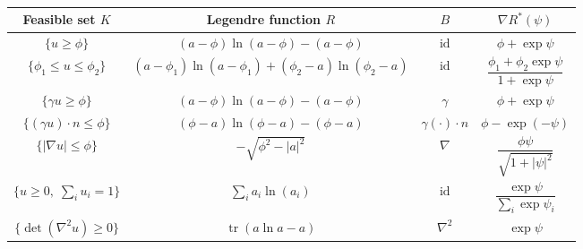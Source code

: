 \documentclass[aspectratio=169,xcolor=dvipsnames,11pt]{beamer}
\begin{document}
\begin{frame}\frametitle{}
\thispagestyle{empty}
\begin{table}
\centering
\small
\setlength{\tabcolsep}{5pt}
\renewcommand{\arraystretch}{1.4}
    \begin{tabular}{ c|c|c|c } 
     \toprule
      Feasible set $K$ & Legendre function $R$ & $B$ & $\nabla R^*(\psi)$ \\ 
     \midrule
     $\big\{ u \geq \phi \big\}$ & $(a - \phi) \ln (a - \phi) - (a - \phi)$ & $\operatorname{id}$ & $\phi + \exp\psi$ \\[2ex]
     $\big\{ \phi_1 \leq u \leq \phi_2 \big\}$ & $(a - \phi_1) \ln (a - \phi_1) + (\phi_2-a) \ln (\phi_2-a)$ & $\operatorname{id}$ & $\dfrac{\phi_1 + \phi_2\exp\psi}{1 + \exp\psi}$ \\[2ex]
     $\big\{\gamma u \ge \phi \big\}$ & $(a-\phi) \ln (a - \phi) - (a - \phi)$ & $\gamma$ &  $\phi + \exp\psi$ \\[2ex]
     $\big\{ (\gamma u)\cdot n \leq \phi \big\}$ & $(\phi-a) \ln (\phi - a) - (\phi - a)$ & $\gamma(\cdot) \cdot n$ & $\phi - \exp(-\psi)$ \\[2ex]
     $\big\{| \nabla u | \le \phi \big\}$ & $ -\sqrt{\phi^2 - | a |^2}$ & $\nabla$  & $\dfrac{\phi\psi}{\sqrt{1 + | \psi |^2}}$ \\[3ex] 
     $\big\{ u \ge 0,\; \sum_{i} u_i = 1 \big\}$ & $\sum_{i} a_i \ln(a_i)$ & $\operatorname{id}$ & $\dfrac{\exp\psi}{\sum_{i} \exp\psi_i}$\\[2ex]
     $\big\{ \det (\nabla^2 u) \geq 0 \big\}$ & $\operatorname{tr}(a\ln a - a)$ & $\nabla^2$ & $\exp \psi$ \\[2ex]
     \bottomrule
    \end{tabular}
\vspace{-1em}
\end{table}
\end{frame}
\end{document}
